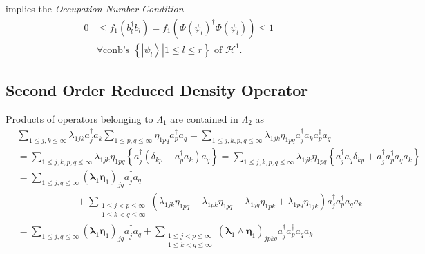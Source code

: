 \documentclass[aps,preprint]{revtex4}%
\begin{document}
implies the \emph{Occupation Number Condition}
\begin{align}
0  &  \leq f_{1}\left(  b_{l}^{\dagger}b_{l}\right)  =f_{1}\left(  \Phi\left(
\psi_{l}\right)  ^{\dagger}\Phi\left(  \psi_{l}\right)  \right)
\leq1\,\nonumber\\
&  \forall\text{conb's }\left\{  \left.  \left\vert \psi_{l}\right\rangle
\right\vert 1\leq l\leq r\right\}  \text{ of }\mathcal{H}^{1}. \label{occnum}%
\end{align}


\subsection{Second Order Reduced Density Operator}

Products of operators belonging to $\Lambda_{1}$ are contained in $\Lambda
_{2}$ as%
\begin{align}
&  \sum_{1\leq j,k\leq\infty}\lambda_{1jk}a_{j}^{\dagger}a_{k}\sum_{1\leq
p,q\leq\infty}\eta_{1pq}a_{p}^{\dagger}a_{q}=\sum_{1\leq j,k,p,q\leq\infty
}\lambda_{1jk}\eta_{1pq}a_{j}^{\dagger}a_{k}a_{p}^{\dagger}a_{q}\nonumber\\
&  =\sum_{1\leq j,k,p,q\leq\infty}\lambda_{1jk}\eta_{1pq}\left\{
a_{j}^{\dagger}\left(  \delta_{kp}-a_{p}^{\dagger}a_{k}\right)  a_{q}\right\}
=\sum_{1\leq j,k,p,q\leq\infty}\lambda_{1jk}\eta_{1pq}\left\{  a_{j}^{\dagger
}a_{q}\delta_{kp}+a_{j}^{\dagger}a_{p}^{\dagger}a_{q}a_{k}\right\} \nonumber\\
&  =\sum_{1\leq j,q\leq\infty}\left(  \mathbf{\lambda}_{1}\mathbf{\eta}%
_{1}\right)  _{jq}a_{j}^{\dagger}a_{q}\nonumber\\
&  \qquad\qquad\qquad+\sum_{\substack{1\leq j<p\leq\infty\\1\leq k<q\leq
\infty}}\left(  \lambda_{1jk}\eta_{1pq}-\lambda_{1pk}\eta_{1jq}-\lambda
_{1jq}\eta_{1pk}+\lambda_{1pq}\eta_{1jk}\right)  a_{j}^{\dagger}a_{p}%
^{\dagger}a_{q}a_{k}\nonumber\\
&  =\sum_{1\leq j,q\leq\infty}\left(  \mathbf{\lambda}_{1}\mathbf{\eta}%
_{1}\right)  _{jq}a_{j}^{\dagger}a_{q}+\sum_{\substack{1\leq j<p\leq
\infty\\1\leq k<q\leq\infty}}\left(  \mathbf{\lambda}_{1}\wedge\mathbf{\eta
}_{1}\right)  _{jpkq}a_{j}^{\dagger}a_{p}^{\dagger}a_{q}a_{k}%
\end{align}
\end{document}
